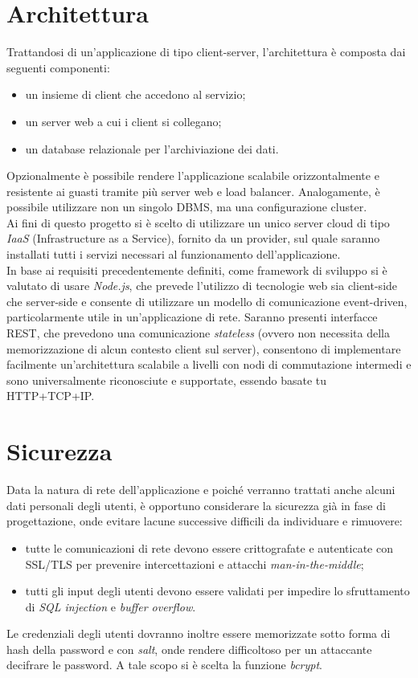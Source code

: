 \documentclass[11pt]{report}
\begin{document}
\section{Architettura}
Trattandosi di un'applicazione di tipo client-server, l'architettura è composta dai seguenti componenti:
\begin{itemize}
	\item un insieme di client che accedono al servizio;
	\item un server web a cui i client si collegano;
	\item un database relazionale per l'archiviazione dei dati.
\end{itemize}
Opzionalmente è possibile rendere l'applicazione scalabile orizzontalmente e resistente ai guasti tramite più server web e load balancer.
Analogamente, è possibile utilizzare non un singolo DBMS, ma una configurazione cluster.
\\Ai fini di questo progetto si è scelto di utilizzare un unico server cloud di tipo \textit{IaaS} (Infrastructure as a Service), fornito da un provider, sul quale saranno installati tutti i servizi necessari al funzionamento dell'applicazione.
\\In base ai requisiti precedentemente definiti, come framework di sviluppo si è valutato di usare \textit{Node.js}, che prevede l'utilizzo di tecnologie web sia client-side che server-side e consente di utilizzare un modello di comunicazione event-driven, particolarmente utile in un'applicazione di rete.
Saranno presenti interfacce REST, che prevedono una comunicazione \textit{stateless} (ovvero non necessita della memorizzazione di alcun contesto client sul server), consentono di implementare facilmente un'architettura scalabile a livelli con nodi di commutazione intermedi e sono universalmente riconosciute e supportate, essendo basate tu HTTP+TCP+IP.

\section{Sicurezza}
Data la natura di rete dell'applicazione e poiché verranno trattati anche alcuni dati personali degli utenti, è opportuno considerare la sicurezza già in fase di progettazione, onde evitare lacune successive difficili da individuare e rimuovere:
\begin{itemize}
	\item tutte le comunicazioni di rete devono essere crittografate e autenticate con SSL/TLS per prevenire intercettazioni e attacchi \textit{man-in-the-middle};
	\item tutti gli input degli utenti devono essere validati per impedire lo sfruttamento di \textit{SQL injection} e \textit{buffer overflow}.
\end{itemize}
Le credenziali degli utenti dovranno inoltre essere memorizzate sotto forma di hash della password e con \textit{salt}, onde rendere difficoltoso per un attaccante decifrare le password.
A tale scopo si è scelta la funzione \textit{bcrypt}.
\end{document}
